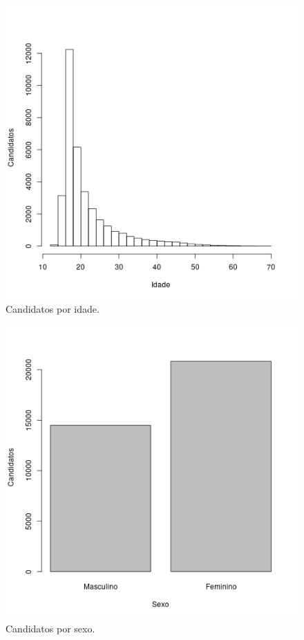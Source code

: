 \documentclass[12pt]{article}
\begin{document}
\begin{minipage}{.5\textwidth}
    \begin{figure}[H]
    \includegraphics[width=.9\linewidth]{../geral_candidatos-por-idade.png}
    \caption{Candidatos por idade.}
    \label{fig:candidatos-por-idade}
    \end{figure}
\end{minipage}%
\begin{minipage}{.5\textwidth}
    \begin{figure}[H]
    \includegraphics[width=.9\linewidth]{../geral_candidatos-por-sexo.png}
    \caption{Candidatos por sexo.}
    \label{fig:candidatos-por-sexo}
    \end{figure}
\end{minipage}
\end{document}

